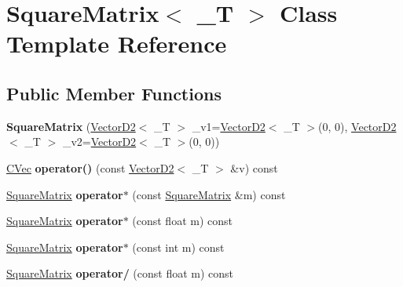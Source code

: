 \hypertarget{class_square_matrix}{
\section{SquareMatrix$<$ \_\-T $>$ Class Template Reference}
\label{class_square_matrix}
}
\subsection*{Public Member Functions}
\begin{DoxyCompactItemize}
\item 
\hypertarget{class_square_matrix_aefea0c37b4f54b4f054480f898ed9f70}{
{\bfseries SquareMatrix} (\hyperlink{struct_vector_d2}{VectorD2}$<$ \_\-T $>$ \_\-v1=\hyperlink{struct_vector_d2}{VectorD2}$<$ \_\-T $>$(0, 0), \hyperlink{struct_vector_d2}{VectorD2}$<$ \_\-T $>$ \_\-v2=\hyperlink{struct_vector_d2}{VectorD2}$<$ \_\-T $>$(0, 0))}
\label{class_square_matrix_aefea0c37b4f54b4f054480f898ed9f70}

\item 
\hypertarget{class_square_matrix_a7368047d088ed55e3e6e266ea5fb29b0}{
\hyperlink{struct_vector_d2}{CVec} {\bfseries operator()} (const \hyperlink{struct_vector_d2}{VectorD2}$<$ \_\-T $>$ \&v) const }
\label{class_square_matrix_a7368047d088ed55e3e6e266ea5fb29b0}

\item 
\hypertarget{class_square_matrix_aef172ac49e0415176c7beeec616e4512}{
\hyperlink{class_square_matrix}{SquareMatrix} {\bfseries operator$\ast$} (const \hyperlink{class_square_matrix}{SquareMatrix} \&m) const }
\label{class_square_matrix_aef172ac49e0415176c7beeec616e4512}

\item 
\hypertarget{class_square_matrix_ac17de276b304090c0e626055cd8b6c54}{
\hyperlink{class_square_matrix}{SquareMatrix} {\bfseries operator$\ast$} (const float m) const }
\label{class_square_matrix_ac17de276b304090c0e626055cd8b6c54}

\item 
\hypertarget{class_square_matrix_a375aca11962889e595220955f1b6f251}{
\hyperlink{class_square_matrix}{SquareMatrix} {\bfseries operator$\ast$} (const int m) const }
\label{class_square_matrix_a375aca11962889e595220955f1b6f251}

\item 
\hypertarget{class_square_matrix_a28129d72b678e08172b28b716a3d846f}{
\hyperlink{class_square_matrix}{SquareMatrix} {\bfseries operator/} (const float m) const }
\label{class_square_matrix_a28129d72b678e08172b28b716a3d846f}


\end{DoxyCompactItemize}
